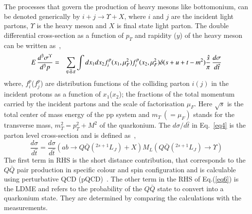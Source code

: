 
The processes that govern the production of heavy mesons like bottomonium,
can be denoted generically by 
$i+j\rightarrow \Upsilon +X$, where $i$ and $j$ are the incident light partons,
$\Upsilon$ is the heavy meson and $X$ is final state light parton.
The double differential cross-section as a function of $p_T$ and rapidity ($y$) of 
the heavy meson can be written as~\cite{Kumar:2016ojy},
\begin{eqnarray}
  E\,\frac{d^3\sigma^{\Upsilon} }{d^3p} &=& \sum_{q,\overline{q},g} \int dx_1 dx_2 f_{i}^p(x_1,\mu_F^2)
  f_{i}^p(x_2,\mu_F^2) \delta(s+u+t-m^2) {\hat{s} \over \pi} \, \frac{d\sigma}{d\hat{t}}
  \label{eq4}
\end{eqnarray}
where, $f_{i}^p$($f_{j}^p$) are distribution functions of the colliding parton $i(j)$ in
the incident protons as a function of $x_1$($x_2$); the fractions of the total momentum
carried by the incident partons and the scale of factorisation $\mu_F$.
Here $\sqrt{s}$ is the total center of mass energy of the pp system and $m_T~(=\mu_F)$ stands for
the transverse mass, $m_T^2=p_T^2 + M^2$ of the quarkonium.
The ${d\sigma}/{d\hat{t}}$ in Eq.~\ref{eq4} is the parton level cross-section and is
defined as~\cite{Bodwin:1994jh},
\begin{equation}
  \frac{d\sigma}{d\hat{t}} = \frac{d\sigma}{d\hat{t}}(ab\rightarrow Q\bar{Q}(^{2s+1}L_J)+X)
  M_L(Q\bar{Q}(^{2s+1}L_J)\rightarrow \Upsilon)
  \label{eq6}
\end{equation}
The first term in RHS is the short distance contribution, that corresponds to the $Q\bar{Q}$
pair production in specific colour and spin configuration and is calculable using 
perturbative QCD (pQCD)~\cite{Braaten:2000cm,Baier:1983va,Humpert:1986cy,Gastmans:1987be,Cho:1995vh,Cho:1995ce}.
The other term in the RHS of Eq.(\ref{eq6}) is the LDME 
and refers to the probability of the $Q\bar{Q}$ state to convert into a quarkonium state.
They are determined by comparing the calculations with the measurements.






